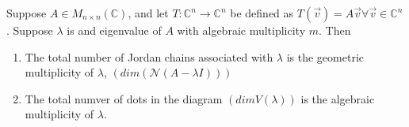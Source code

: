 \documentclass{report}
\begin{document}
   {
	   Suppose $ A \in M _{ n \times n}\left(  \mathbb{C} \right) $, and let $ T: \mathbb{C} ^{n} \to \mathbb{C} ^{n}$ be defined as $ T \left( \vec{ v}  \right) = A  \vec{ v} \forall  \vec{ v} \in \mathbb{C} ^{n}$. Suppose $ \lambda$ is and eigenvalue of $ A$ with algebraic multiplicity $ m$.
	   Then
	   \begin{enumerate}[label=(\arabic*).]  
	   \item The total number of Jordan chains associated with $ \lambda$ is the geometric multiplicity of $ \lambda$, $ \left( dim \left( \mathcal{N} \left( A - \lambda I \right)  \right)  \right) $
	   \item  The total numver of dots in the diagram $ \left( dim V \left( \lambda \right)  \right) $ is the algebraic multiplicity of $ \lambda$.
	   \end{enumerate}
   }
   
\end{document}
